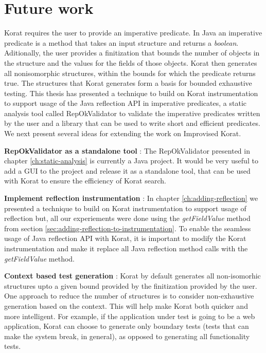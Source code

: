 \chapter{Future work}
\label{ch:future-work}
Korat requires the user to provide an imperative predicate. In Java an imperative predicate is a method that takes an input structure and returns a \emph{boolean}. Aditionally, the user provides a finitization that bounds the number of objects in the structure and the values for the fields of those objects. Korat then generates all nonisomorphic structures, within the bounds for which the predicate returns true. The structures that Korat generates form a basis for bounded exhaustive testing. This thesis has presented a technique to build on Korat instrumentation to support usage of the Java reflection API in imperative predicates, a static analysis tool called RepOkValidator to validate the imperative predicates written by the user and a library that can be used to write short and efficient predicates. We next present several ideas for extending the work on Improvised Korat.

\para
\textbf{RepOkValidator as a standalone tool} : The RepOkValidator presented in chapter \ref{ch:static-analysis} is currently a Java project. It would be very useful to add a GUI to the project and release it as a standalone tool, that can be used with Korat to ensure the efficiency of Korat search.

\para
\textbf{Implement reflection instrumentation} : In chapter \ref{ch:adding-reflection} we presented a technique to build on Korat instrumentation to support usage of reflection but, all our experiements were done using the \emph{getFieldValue} method from section \ref{sec:adding-reflection-to-instrumentation}. To enable the seamless usage of Java reflection API with Korat, it is important to modify the Korat instrumentation and make it replace all Java reflection method calls with the \emph{getFieldValue} method.

\para
\textbf{Context based test generation} : Korat by default generates all non-isomorhic structures upto a given bound provided by the finitization provided by the user. One approach to reduce the number of structures is to consider non-exhaustive generation based on the context. This will help make Korat both quicker and more intelligent. For example, if the application under test is going to be a web application, Korat can choose to generate only boundary tests (tests that can make the system break, in general), as opposed to generating all functionality tests.

